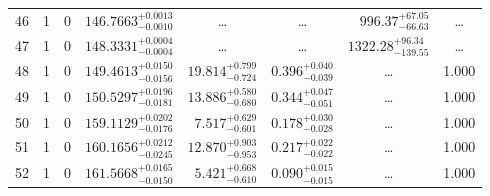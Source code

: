 \begin{table*}[!]
\begin{tabular}{llcrrlrc}
46 & 1 & 0 & $    146.7663_{-      0.0010}^{+      0.0013}$ & \multicolumn{1}{c}{\dots} & \multicolumn{1}{c}{\dots} & $      996.37_{-       66.63}^{+       67.05}$ & \dots \\[1pt]
47 & 1 & 0 & $    148.3331_{-      0.0004}^{+      0.0004}$ & \multicolumn{1}{c}{\dots} & \multicolumn{1}{c}{\dots} & $     1322.28_{-      139.55}^{+       96.34}$ & \dots \\[1pt]
48 & 1 & 0 & $    149.4613_{-      0.0156}^{+      0.0150}$ & $      19.814_{-       0.724}^{+       0.799}$ & $       0.396_{-       0.039}^{+       0.040}$ & \multicolumn{1}{c}{\dots} & 1.000 \\[1pt]
49 & 1 & 0 & $    150.5297_{-      0.0181}^{+      0.0196}$ & $      13.886_{-       0.680}^{+       0.580}$ & $       0.344_{-       0.051}^{+       0.047}$ & \multicolumn{1}{c}{\dots} & 1.000\\[1pt]

50 & 1 & 0 & $    159.1129_{-      0.0176}^{+      0.0202}$ & $       7.517_{-       0.601}^{+       0.629}$ & $       0.178_{-       0.028}^{+       0.030}$ & \multicolumn{1}{c}{\dots} & 1.000\\[1pt]
51 & 1 & 0 & $    160.1656_{-      0.0245}^{+      0.0212}$ & $      12.870_{-       0.953}^{+       0.903}$ & $       0.217_{-       0.022}^{+       0.022}$ & \multicolumn{1}{c}{\dots} & 1.000\\[1pt]
52 & 1 & 0 & $    161.5668_{-      0.0150}^{+      0.0165}$ & $       5.421_{-       0.610}^{+       0.668}$ & $       0.090_{-       0.015}^{+       0.015}$ & \multicolumn{1}{c}{\dots} & 1.000\\[1pt]

\hline
\end{tabular}
\end{table*}



